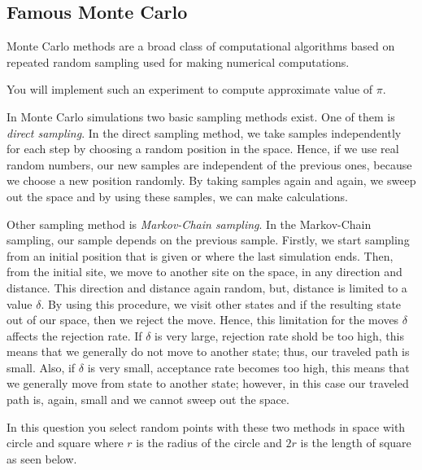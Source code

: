 \documentclass[a4paper]{article}
\begin{document}
\subsection{Famous Monte Carlo}

Monte Carlo methods are a broad class of computational algorithms based on repeated random sampling used for making numerical computations.

You will implement such an experiment to compute approximate value of $ \pi $.

In Monte Carlo simulations two basic sampling methods exist. One of them is \textit{direct sampling}. In the direct sampling method, we take samples independently for each step by choosing a random position in the space. Hence, if we use real random numbers, our new samples are independent of the previous ones, because we choose a new  position randomly. By taking samples again and again, we sweep out the space and by using these samples, we can make calculations. 

Other sampling method is \textit{Markov-Chain sampling}. In the Markov-Chain sampling, our sample depends on the previous sample. Firstly, we start sampling from an initial position that is given or where the last simulation ends. Then, from the initial
site, we move to another site on the space, in any direction and distance. This direction
and distance again random, but, distance is limited to a value $ \delta $. By using this procedure, we visit other states and if the resulting state out of our space, then we reject the move. Hence, this limitation for the moves $\delta  $ affects the rejection rate.
If $ \delta $ is very large, rejection rate shold be too high, this means that we generally do not move to another state; thus, our traveled path is small. Also, if $ \delta $ is very small, acceptance rate becomes too high, this means that we generally move from state to another state; however, in this case our traveled path is, again, small and we cannot sweep out the space. 

In this question you select random points with these two methods in space with circle and square where $ r $ is the radius of the circle and $ 2r $ is the length of square as seen below.
\end{document}
